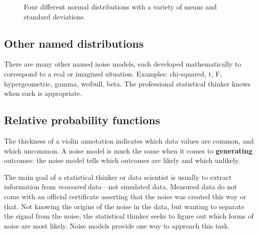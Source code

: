 \documentclass[
  letterpaper,
  DIV=11,
  numbers=noendperiod,
  oneside]{scrartcl}
\begin{document}
\begin{figure}[H]


\caption{\label{fig-four-normals}Four different normal distributions
with a variety of means and standard deviations.}

\end{figure}%

\subsection{Other named distributions}\label{other-named-distributions}

There are many other named noise models, each developed mathematically
to correspond to a real or imagined situation. Examples: chi-squared, t,
F, hypergeometric, gamma, weibull, beta. The professional statistical
thinker knows when each is appropriate.

\subsection{Relative probability
functions}\label{relative-probability-functions}

The thickness of a violin annotation indicates which data values are
common, and which uncommon. A noise model is much the same when it comes
to \textbf{generating} outcomes: the noise model tells which outcomes
are likely and which unlikely.

The main goal of a statistical thinker or data scientist is usually to
extract information from \emph{measured} data---not simulated data.
Measured data do not come with an official certificate asserting that
the noise was created this way or that. Not knowing the origins of the
noise in the data, but wanting to separate the signal from the noise,
the statistical thinker seeks to figure out which forms of noise are
most likely. Noise models provide one way to approach this task.
\end{document}
